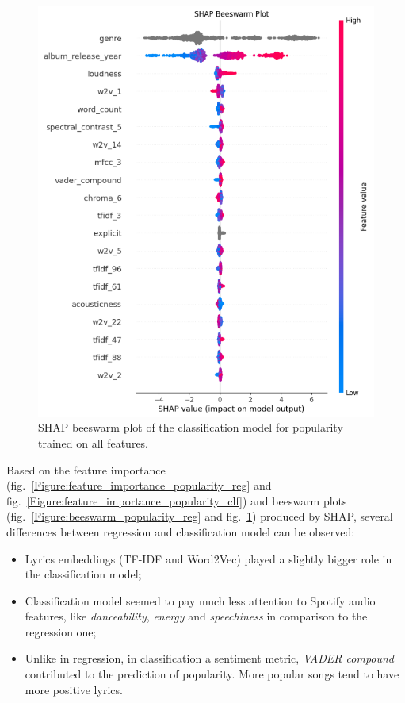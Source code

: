 \begin{center}
\begin{figure}[H]
  \centering
  \includegraphics[width=6in]{img/beeswarm_popularity_clf.png}
  \caption{SHAP beeswarm plot of the classification model for popularity trained on all features.}
  \label{Figure:beeswarm_popularity_clf}
\end{figure}
\end{center}


Based on the feature
importance (fig.~\ref{Figure:feature_importance_popularity_reg} and
fig.~\ref{Figure:feature_importance_popularity_clf}) and beeswarm
plots (fig.~\ref{Figure:beeswarm_popularity_reg} and
fig.~\ref{Figure:beeswarm_popularity_clf}) produced by SHAP, several differences
between regression and classification model can be observed:
\begin{itemize}
  \item Lyrics embeddings (TF-IDF and Word2Vec) played a slightly bigger role in
    the classification model;
  \item Classification model seemed to pay much less attention to Spotify audio
    features, like \textit{danceability}, \textit{energy} and
    \textit{speechiness} in comparison to the regression one;
  \item Unlike in regression, in classification a sentiment metric,
    \textit{VADER compound} contributed to the prediction of popularity. More
    popular songs tend to have more positive lyrics.
\end{itemize}


